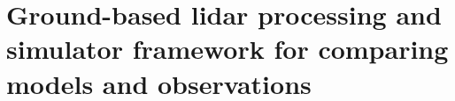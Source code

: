 \chapter{Ground-based lidar processing and simulator framework for
comparing models and observations}
